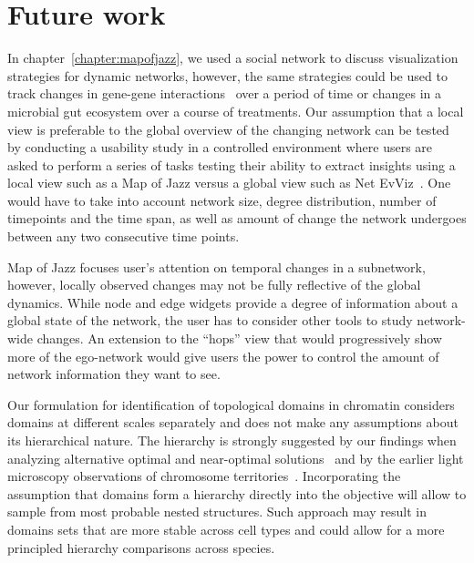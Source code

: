 \documentclass[12pt]{cmuthesis}
\begin{document}





\section{Future work}

In chapter~\ref{chapter:mapofjazz}, we used a social network to discuss visualization strategies for dynamic networks, however, the same strategies could be used to track changes in gene-gene interactions~\cite{GeneKnockouts} over a period of time or changes in a microbial gut ecosystem over a course of treatments. Our assumption that a local view is preferable to the global overview of the changing network can be tested by conducting a usability study in a controlled environment where users are asked to perform a series of tasks testing their ability to extract insights using a local view such as a Map of Jazz versus a global view such as Net EvViz~\cite{Khurana2011}. One would have to take into account network size, degree distribution, number of timepoints and the time span, as well as amount of change the network undergoes between any two consecutive time points.

Map of Jazz focuses user's attention on temporal changes in a subnetwork, however, locally observed changes may not be fully reflective of the global dynamics. While node and edge widgets provide a degree of information about a global state of the network, the user has to consider other tools to study network-wide changes. An extension to the ``hops'' view that would progressively show more of the ego-network would give users the power to control the amount of network information they want to see.

Our formulation for identification of topological domains in chromatin considers domains at different scales separately and does not make any assumptions about its hierarchical nature. The hierarchy is strongly suggested by our findings when analyzing alternative optimal and near-optimal solutions~\cite{ArmatusAMB} and by the earlier light microscopy observations of chromosome territories~\cite{Cremer2010}. Incorporating the assumption that domains form a hierarchy directly into the objective will allow to sample from most probable nested structures. Such approach may result in domains sets that are more stable across cell types and could allow for a more principled hierarchy comparisons across species.
\end{document}

